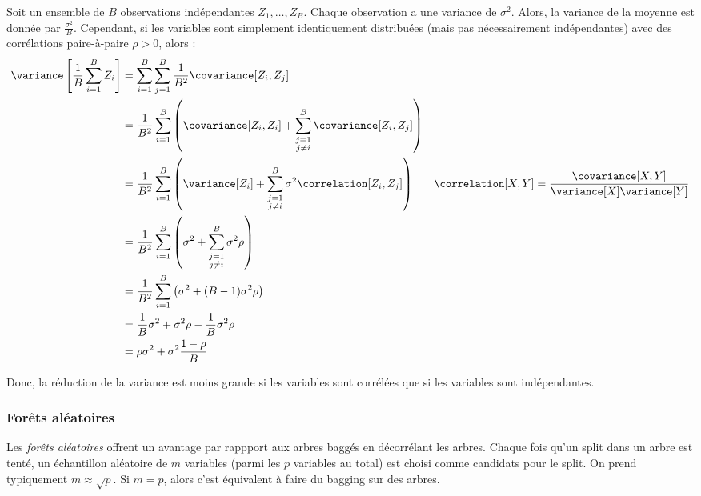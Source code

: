                Soit un ensemble de \(B\) observations indépendantes \(Z_1, \dots, Z_B\). Chaque observation a une variance de \(\sigma^2\). Alors, la variance de la moyenne est donnée par \(\frac{\sigma^2}{B}\). Cependant, si les variables sont simplement identiquement distribuées (mais pas nécessairement indépendantes) avec des corrélations paire-à-paire \(\rho > 0\), alors :
                \begin{align*}
                    \variance\left[\frac{1}{B} \sum_{i = 1}^B Z_i\right] &= \sum_{i=1}^B \sum_{j=1}^B \frac{1}{B^2} \covariance[Z_i, Z_j]\\
                    &= \frac{1}{B^2} \sum_{i=1}^B \left(\covariance[Z_i, Z_i] + \sum_{\substack{j=1\\j\not=i}}^B \covariance[Z_i, Z_j]\right)\\
                    &= \frac{1}{B^2} \sum_{i=1}^B \left(\variance[Z_i] + \sum_{\substack{j = 1\\j\not=i}}^B \sigma^2 \correlation[Z_i, Z_j]\right) & \correlation[X, Y] = \frac{\covariance[X, Y]}{\variance[X] \variance[Y]}\\
                    &= \frac{1}{B^2} \sum_{i=1}^B \left(\sigma^2 + \sum_{\substack{j = 1\\j\not=i}}^B \sigma^2 \rho\right)\\
                    &= \frac{1}{B^2} \sum_{i=1}^B \left(\sigma^2 + (B - 1)\sigma^2 \rho\right)\\
                    &= \frac{1}{B}\sigma^2 + \sigma^2 \rho - \frac{1}{B}\sigma^2\rho\\
                    &= \rho\sigma^2 + \sigma^2 \frac{1 - \rho}{B}
                \end{align*}

                Donc, la réduction de la variance est moins grande si les variables sont corrélées que si les variables sont indépendantes.

        \subsubsection{Forêts aléatoires}
            Les \textit{forêts aléatoires} offrent un avantage par rappport aux arbres baggés en décorrélant les arbres. Chaque fois qu'un split dans un arbre est tenté, un échantillon aléatoire de \(m\) variables (parmi les \(p\) variables au total) est choisi comme candidats pour le split. On prend typiquement \(m \approx \sqrt{p}\). Si \(m = p\), alors c'est équivalent à faire du bagging sur des arbres.